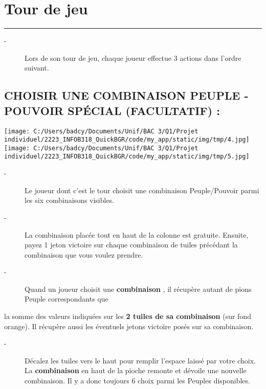 \documentclass{scrartcl}%
\begin{document}
%
\sectionfont{\color{mygreen}}%
\subsectionfont{\color{mygreen}}%
\subsubsectionfont{\color{mygreen}}%
\section{ Tour de jeu
}%
\label{sec:Tourdejeu}%
\textcolor{mygreen}{\rule{18cm}{0.07cm}}\break%
\begin{description}%
\item[{-} ]%
%
 Lors de son tour de jeu, chaque joueur effectue 3 actions dans l'ordre suivant.
%
\end{description}

%
\subsection{ CHOISIR UNE COMBINAISON PEUPLE {-} POUVOIR SPÉCIAL (FACULTATIF) :
}%
\label{subsec:CHOISIRUNECOMBINAISONPEUPLE{-}POUVOIRSPCIAL(FACULTATIF)}%
%
\texttt{[image: C:/Users/badcy/Documents/Unif/BAC 3/Q1/Projet individuel/2223\_INFOB318\_QuickBGR/code/my\_app/static/img/tmp/4.jpg]}%
%
\texttt{[image: C:/Users/badcy/Documents/Unif/BAC 3/Q1/Projet individuel/2223\_INFOB318\_QuickBGR/code/my\_app/static/img/tmp/5.jpg]}%

%
\begin{description}%
\item[{-} ]%
%
 Le joueur dont c'est le tour choisit une combinaison Peuple/Pouvoir parmi les six combinaisons visibles.
%
\item[{-} ]%
%
 La combinaison placée tout en haut de la colonne est gratuite. Ensuite, payez 1 jeton victoire sur chaque combinaison de tuiles précédant la combinaison que vous voulez prendre.
%
\item[{-} ]%
%
 Quand un joueur choisit une %
\textcolor{mygreen}{%
\textbf{combinaison}%
}%
, il récupère autant de pions Peuple correspondants que
%
\end{description}%
la somme des valeurs indiquées sur les %
\textcolor{mygreen}{%
\textbf{2 tuiles de sa combinaison}%
}%
\textit{ }%
 (sur fond orange). Il récupère aussi les éventuels jetons victoire posés sur sa combinaison.
%
\begin{description}%
\item[{-} ]%
%
 Décalez les tuiles vers le haut pour remplir l’espace laissé par votre choix. La %
\textcolor{mygreen}{%
\textbf{combinaison}%
}%
\textit{ }%
 en haut de la pioche remonte et dévoile une nouvelle combinaison. Il y a donc toujours 6 choix parmi les Peuples disponibles.
%
\end{description}
\end{document}

